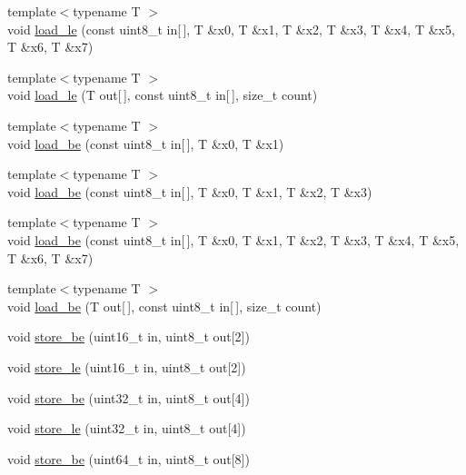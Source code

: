 \begin{DoxyCompactItemize}
\item 
{\footnotesize template$<$typename T $>$ }\\void \hyperlink{namespace_botan_a170a82161413e005b53c3db27d79678e}{load\+\_\+le} (const uint8\+\_\+t in\mbox{[}$\,$\mbox{]}, T \&x0, T \&x1, T \&x2, T \&x3, T \&x4, T \&x5, T \&x6, T \&x7)
\item 
{\footnotesize template$<$typename T $>$ }\\void \hyperlink{namespace_botan_a42d83d9e349598b56af765a1acb441bc}{load\+\_\+le} (T out\mbox{[}$\,$\mbox{]}, const uint8\+\_\+t in\mbox{[}$\,$\mbox{]}, size\+\_\+t count)
\item 
{\footnotesize template$<$typename T $>$ }\\void \hyperlink{namespace_botan_a5773c133cf22abd1269664b59c16244a}{load\+\_\+be} (const uint8\+\_\+t in\mbox{[}$\,$\mbox{]}, T \&x0, T \&x1)
\item 
{\footnotesize template$<$typename T $>$ }\\void \hyperlink{namespace_botan_a0b0c4a782d518167985566686e4d1a95}{load\+\_\+be} (const uint8\+\_\+t in\mbox{[}$\,$\mbox{]}, T \&x0, T \&x1, T \&x2, T \&x3)
\item 
{\footnotesize template$<$typename T $>$ }\\void \hyperlink{namespace_botan_a996923074c3867c0f2ce1d1b96b8fd4b}{load\+\_\+be} (const uint8\+\_\+t in\mbox{[}$\,$\mbox{]}, T \&x0, T \&x1, T \&x2, T \&x3, T \&x4, T \&x5, T \&x6, T \&x7)
\item 
{\footnotesize template$<$typename T $>$ }\\void \hyperlink{namespace_botan_a0b13c515a5a6599c5074fd9471192b69}{load\+\_\+be} (T out\mbox{[}$\,$\mbox{]}, const uint8\+\_\+t in\mbox{[}$\,$\mbox{]}, size\+\_\+t count)
\item 
void \hyperlink{namespace_botan_a26f4a43173adf5f333b598149c3eef1e}{store\+\_\+be} (uint16\+\_\+t in, uint8\+\_\+t out\mbox{[}2\mbox{]})
\item 
void \hyperlink{namespace_botan_ac0c49ee3a99775f2fba422752fdbc21a}{store\+\_\+le} (uint16\+\_\+t in, uint8\+\_\+t out\mbox{[}2\mbox{]})
\item 
void \hyperlink{namespace_botan_a237738c57bc371f45785750daad2cf7f}{store\+\_\+be} (uint32\+\_\+t in, uint8\+\_\+t out\mbox{[}4\mbox{]})
\item 
void \hyperlink{namespace_botan_aced6f16a306b58cc117c3a03e04cf788}{store\+\_\+le} (uint32\+\_\+t in, uint8\+\_\+t out\mbox{[}4\mbox{]})
\item 
void \hyperlink{namespace_botan_af55277e5a97f10bb1f19a121bfcce030}{store\+\_\+be} (uint64\+\_\+t in, uint8\+\_\+t out\mbox{[}8\mbox{]})

\end{DoxyCompactItemize}
